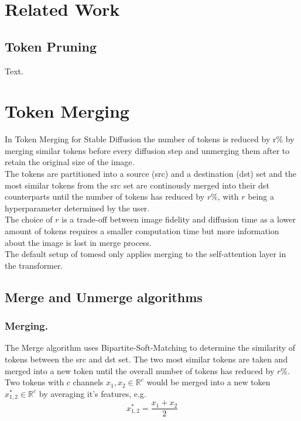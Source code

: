\documentclass{article}
\begin{document}
\newpage
\section{Related Work}

\subsection{Token Pruning}
Text.





\newpage
\section{Token Merging}
In Token Merging for Stable Diffusion\cite{bolya2023tomesd} the number of tokens is reduced by r\% by merging similar tokens before every diffusion step and unmerging them after to retain the original size of the image.\\ The tokens are partitioned into a source (src) and a destination (dst) set and the most similar tokens from the src set are continously merged into their dst counterparts until the number of tokens has reduced by \(r\)\%, with \(r\) being a hyperparameter determined by the user.\\ The choice of \(r\) is a trade-off between image fidelity and diffusion time as a lower amount of tokens requires a smaller computation time but more information about the image is lost in merge process.\\
The default setup of tomesd\cite{bolya2023tomesd} only applies merging to the self-attention layer in the transformer.

\subsection{Merge and Unmerge algorithms}
\subsubsection*{Merging.} The Merge algorithm uses Bipartite-Soft-Matching to determine the similarity of tokens between the src and dst set. The two most similar tokens are taken and merged into a new token until the overall number of tokens has reduced by \(r\)\%.\\
Two tokens with \(c\) channels \(x_1, x_2  \in \mathbb{R}^c\) would be merged into a new token \(x_{1,2}^* \in \mathbb{R}^c \) by averaging it's features, e.g. \[x_{1,2}^* = \frac{x_1 + x_2}{2}\]
\end{document}
